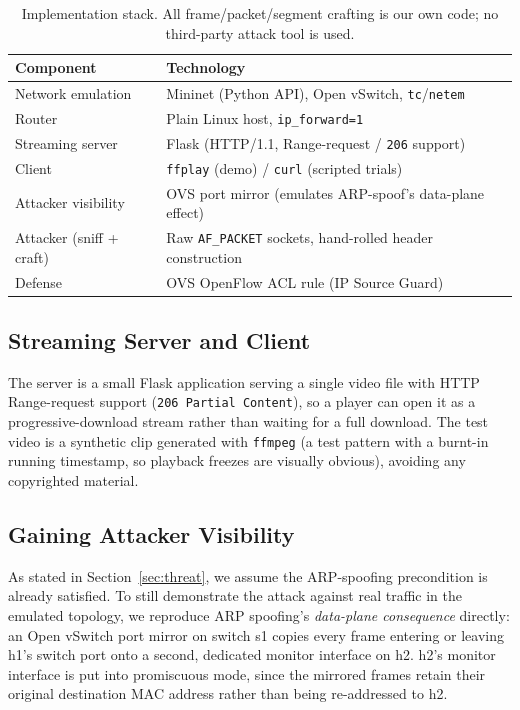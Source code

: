 \documentclass[11pt]{article}
\begin{document}
\begin{table}[h]
\centering\small
\begin{tabular}{ll}
\toprule
Component & Technology \\
\midrule
Network emulation & Mininet (Python API), Open vSwitch, \texttt{tc}/\texttt{netem} \\
Router & Plain Linux host, \texttt{ip\_forward=1} \\
Streaming server & Flask (HTTP/1.1, Range-request / \texttt{206} support) \\
Client & \texttt{ffplay} (demo) / \texttt{curl} (scripted trials) \\
Attacker visibility & OVS port mirror (emulates ARP-spoof's data-plane effect) \\
Attacker (sniff + craft) & Raw \texttt{AF\_PACKET} sockets, hand-rolled header construction \\
Defense & OVS OpenFlow ACL rule (IP Source Guard) \\
\bottomrule
\end{tabular}
\caption{Implementation stack. All frame/packet/segment crafting is our
own code; no third-party attack tool is used.}
\label{tab:stack}
\end{table}

\subsection{Streaming Server and Client}

The server is a small Flask application serving a single video file
with HTTP Range-request support (\texttt{206 Partial Content}), so a
player can open it as a progressive-download stream rather than waiting
for a full download. The test video is a synthetic clip generated with
\texttt{ffmpeg} (a test pattern with a burnt-in running timestamp, so
playback freezes are visually obvious), avoiding any copyrighted
material.

\subsection{Gaining Attacker Visibility}
\label{sec:visibility}

As stated in Section~\ref{sec:threat}, we assume the ARP-spoofing
precondition is already satisfied. To still demonstrate the attack
against real traffic in the emulated topology, we reproduce ARP
spoofing's \emph{data-plane consequence} directly: an Open vSwitch port
mirror on switch s1 copies every frame entering or leaving h1's switch
port onto a second, dedicated monitor interface on h2. h2's monitor
interface is put into promiscuous mode, since the mirrored frames retain
their original destination MAC address rather than being re-addressed to
h2.
\end{document}
